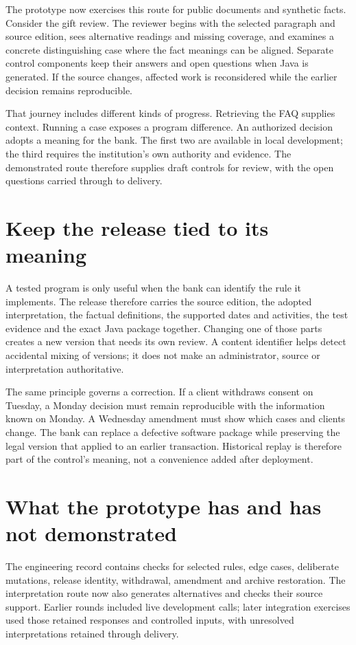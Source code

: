 The prototype now exercises this route for public documents and synthetic facts.
Consider the gift review. The reviewer begins with the selected paragraph and
source edition, sees alternative readings and missing coverage, and examines a
concrete distinguishing case where the fact meanings can be aligned. Separate
control components keep their answers and open questions when Java is generated.
If the source changes, affected work is reconsidered while the earlier decision
remains reproducible.

That journey includes different kinds of progress. Retrieving the FAQ supplies
context. Running a case exposes a program difference. An authorized decision
adopts a meaning for the bank. The first two are available in local development;
the third requires the institution's own authority and evidence. The demonstrated
route therefore supplies draft controls for review, with the open questions
carried through to delivery.

\section{Keep the release tied to its meaning}

A tested program is only useful when the bank can identify the rule it implements.
The release therefore carries the source edition, the adopted interpretation,
the factual definitions, the supported dates and activities, the test evidence
and the exact Java package together. Changing one of those parts creates a new
version that needs its own review. A content identifier helps detect accidental
mixing of versions; it does not make an administrator, source or interpretation
authoritative.

The same principle governs a correction. If a client withdraws consent on
Tuesday, a Monday decision must remain reproducible with the information known
on Monday. A Wednesday amendment must show which cases and clients change. The
bank can replace a defective software package while preserving the legal version
that applied to an earlier transaction. Historical replay is therefore part of
the control's meaning, not a convenience added after deployment.

\section{What the prototype has and has not demonstrated}

The engineering record contains checks for selected rules, edge cases,
deliberate mutations, release identity, withdrawal, amendment and archive
restoration. The interpretation route now also generates alternatives and
checks their source support. Earlier rounds included live development calls;
later integration exercises used those retained responses and controlled
inputs, with unresolved interpretations retained through delivery.

